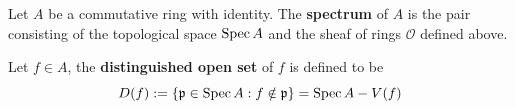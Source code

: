 \begin{definition}
    Let $A$ be a commutative ring with identity. The \textbf{spectrum} of $A$ is the pair consisting of the topological space $\operatorname{Spec} A$ and the sheaf of rings $\mathcal{O}$ defined above. 
\end{definition}




\begin{definition}
    Let $f\in A$, the \textbf{distinguished open set} of $f$ is defined to be
    \begin{equation*}
        D(f):=\left\{\mathfrak{p} \in \operatorname{Spec} A : f \notin \mathfrak{p}\right\}
        =
        \operatorname{Spec} A - V(f)
    \end{equation*}
\end{definition}




















































































